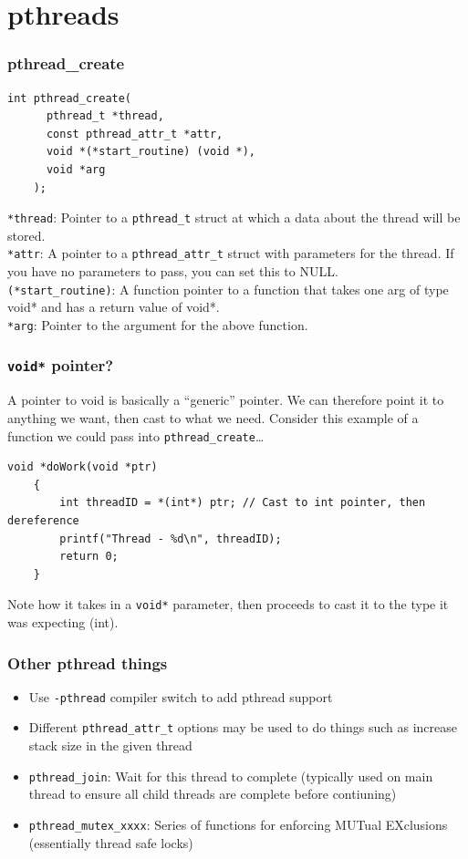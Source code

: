 \documentclass{beamer}
\begin{document}
\section{pthreads}
\begin{frame}[fragile]
  \frametitle{pthread\_create}
  \begin{lstlisting}[style=customc]
    int pthread_create(
      pthread_t *thread, 
      const pthread_attr_t *attr, 
      void *(*start_routine) (void *), 
      void *arg
    );
  \end{lstlisting}
  \texttt{*thread}: Pointer to a \texttt{pthread\_t} struct at which a data about the thread will be stored.\\
  \pause
  \texttt{*attr}: A pointer to a \texttt{pthread\_attr\_t} struct with parameters for the thread. If you have no parameters to pass, you can set this to NULL.\\
  \pause
  \texttt{(*start\_routine)}: A function pointer to a function that takes one arg of type void* and has a return value of void*.\\
  \pause
  \texttt{*arg}: Pointer to the argument for the above function.
\end{frame}
\begin{frame}[fragile]
  \frametitle{\texttt{void*} pointer?}
  A pointer to void is basically a ``generic'' pointer. We can therefore point it to anything we want, then cast to what we need. Consider this example of a function we could pass into \texttt{pthread\_create}\dots
  \begin{lstlisting}[style=customc]
    void *doWork(void *ptr)
    {
        int threadID = *(int*) ptr; // Cast to int pointer, then dereference
        printf("Thread - %d\n", threadID);
        return 0;
    }
  \end{lstlisting}
  Note how it takes in a \texttt{void*} parameter, then proceeds to cast it to the type it was expecting (int).
\end{frame}
\begin{frame}
  \frametitle{Other pthread things}
  \begin{itemize}
    \item Use \texttt{-pthread} compiler switch to add pthread support
    \item Different \texttt{pthread\_attr\_t} options may be used to do things such as increase stack size in the given thread
    \item \texttt{pthread\_join}: Wait for this thread to complete (typically used on main thread to ensure all child threads are complete before contiuning)
    \item \texttt{pthread\_mutex\_xxxx}: Series of functions for enforcing MUTual EXclusions (essentially thread safe locks)
  \end{itemize}
\end{frame}
\end{document}
